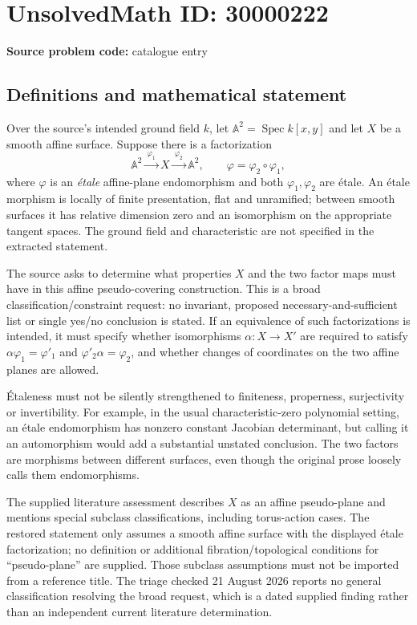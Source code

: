 \documentclass[11pt]{article}
\begin{document}
\section*{UnsolvedMath ID: 30000222}
\textbf{Source problem code:} catalogue entry
\subsection{Definitions and mathematical statement}
Over the source's intended ground field $k$, let $\mathbb A^2=\operatorname{Spec}k[x,y]$ and let $X$ be a smooth affine surface. Suppose there is a factorization
\[
 \mathbb A^2\xrightarrow{\ \varphi_1\ }X
       \xrightarrow{\ \varphi_2\ }\mathbb A^2,
 \qquad \varphi=\varphi_2\circ\varphi_1,
\]
where $\varphi$ is an \emph{\'etale} affine-plane endomorphism and both $\varphi_1,\varphi_2$ are \'etale. An \'etale morphism is locally of finite presentation, flat and unramified; between smooth surfaces it has relative dimension zero and an isomorphism on the appropriate tangent spaces. The ground field and characteristic are not specified in the extracted statement.

The source asks to determine what properties $X$ and the two factor maps must have in this affine pseudo-covering construction. This is a broad classification/constraint request: no invariant, proposed necessary-and-sufficient list or single yes/no conclusion is stated. If an equivalence of such factorizations is intended, it must specify whether isomorphisms $\alpha:X\to X'$ are required to satisfy $\alpha\varphi_1=\varphi'_1$ and $\varphi'_2\alpha=\varphi_2$, and whether changes of coordinates on the two affine planes are allowed.

\'Etaleness must not be silently strengthened to finiteness, properness, surjectivity or invertibility. For example, in the usual characteristic-zero polynomial setting, an \'etale endomorphism has nonzero constant Jacobian determinant, but calling it an automorphism would add a substantial unstated conclusion. The two factors are morphisms between different surfaces, even though the original prose loosely calls them endomorphisms.

The supplied literature assessment describes $X$ as an affine pseudo-plane and mentions special subclass classifications, including torus-action cases. The restored statement only assumes a smooth affine surface with the displayed \'etale factorization; no definition or additional fibration/topological conditions for ``pseudo-plane'' are supplied. Those subclass assumptions must not be imported from a reference title. The triage checked 21 August 2026 reports no general classification resolving the broad request, which is a dated supplied finding rather than an independent current literature determination.
\end{document}
